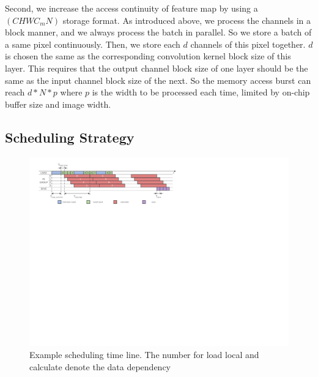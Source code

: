 Second, we increase the access continuity of feature map by using a $(CHWC_mN)$ storage format. As introduced above, we process the channels in a block manner, and we always process the batch in parallel. So we store a batch of a same pixel continuously. Then, we store each $d$ channels of this pixel together.  $d$ is chosen the same as the corresponding convolution kernel block size of this layer. This requires that the output channel block size of one layer should be the same as the input channel block size of the next. So the memory access burst can reach $d*N*p$ where $p$ is the width to be processed each time, limited by on-chip buffer size and image width. 

\subsection{Scheduling Strategy}

\begin{figure}[t]
  \centering
  \includegraphics[width=1.8\columnwidth]{figures/schedule.pdf}
  \caption{Example scheduling time line. The number for load local and calculate denote the data dependency}
  \label{fig:sch}
\end{figure}

